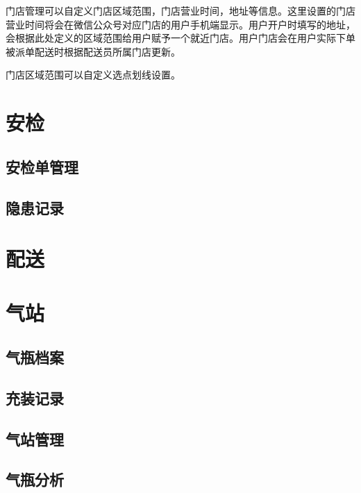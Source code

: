 \documentclass[UTF8]{ctexart}
\begin{document}
门店管理可以自定义门店区域范围，门店营业时间，地址等信息。这里设置的门店营业时间将会在微信公众号对应门店的用户手机端显示。用户开户时填写的地址，会根据此处定义的区域范围给用户赋予一个就近门店。用户门店会在用户实际下单被派单配送时根据配送员所属门店更新。


门店区域范围可以自定义选点划线设置。



\section{安检}

\subsection{安检单管理}

\subsection{隐患记录}


\section{配送}


\section{气站}

\subsection{气瓶档案}

\subsection{充装记录}

\subsection{气站管理}

\subsection{气瓶分析}
\end{document}
